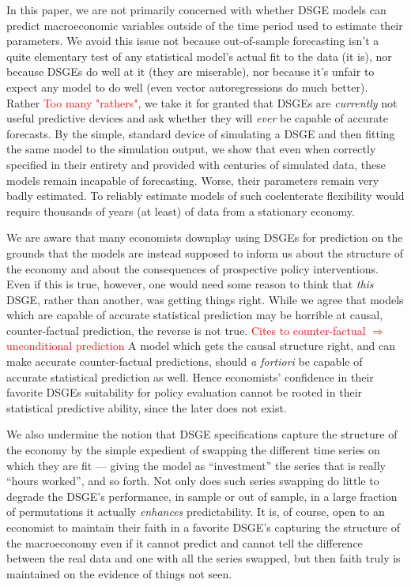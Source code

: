 \documentclass[11pt]{article}
\newcommand{\attn}[1]{\textcolor{red}{#1}}
\begin{document}
In this paper, we are not primarily concerned with whether DSGE models
can predict macroeconomic variables outside of the time period used to
estimate their parameters. We avoid this issue not because out-of-sample
forecasting isn't a quite elementary test of any statistical model's
actual fit to the data (it is), nor because DSGEs do well at it (they
are miserable), nor because it's unfair to expect any model to do well
(even vector autoregressions do much better). Rather
\attn{Too many "rathers"}, we take it for granted that DSGEs are
\emph{currently} not useful predictive devices and ask whether they will
\emph{ever} be capable of accurate forecasts. By the simple, standard
device of simulating a DSGE and then fitting the same model to the
simulation output, we show that even when correctly specified in their
entirety and provided with centuries of simulated data, these models
remain incapable of forecasting. Worse, their parameters remain very
badly estimated. To reliably estimate models of such coelenterate
flexibility would require thousands of years (at least) of data from a
stationary economy.

We are aware that many economists downplay using DSGEs for prediction on
the grounds that the models are instead supposed to inform us about the
structure of the economy and about the consequences of prospective
policy interventions. Even if this is true, however, one would need some
reason to think that \emph{this} DSGE, rather than another, was getting
things right. While we agree that models which are capable of accurate
statistical prediction may be horrible at causal, counter-factual
prediction, the reverse is not true.
\attn{Cites to counter-factual $\Rightarrow$ unconditional
  prediction} A model which gets the causal structure right, and can
make accurate counter-factual predictions, should \emph{a fortiori} be
capable of accurate statistical prediction as well. Hence economists'
confidence in their favorite DSGEs suitability for policy evaluation
cannot be rooted in their statistical predictive ability, since the
later does not exist.

We also undermine the notion that DSGE specifications capture the
structure of the economy by the simple expedient of swapping the
different time series on which they are fit --- giving the model as
``investment'' the series that is really ``hours worked'', and so forth.
Not only does such series swapping do little to degrade the DSGE's
performance, in sample or out of sample, in a large fraction of
permutations it actually \emph{enhances} predictability. It is, of
course, open to an economist to maintain their faith in a favorite
DSGE's capturing the structure of the macroeconomy even if it cannot
predict and cannot tell the difference between the real data and one
with all the series swapped, but then faith truly is maintained on the
evidence of things not seen.
\end{document}
